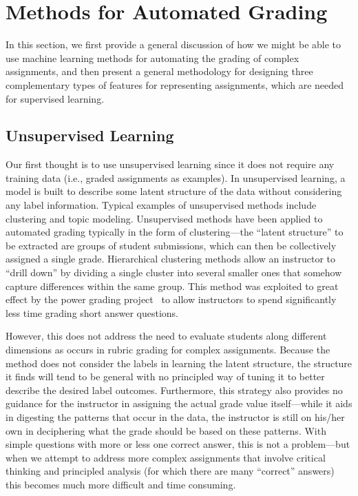 \section{Methods for Automated Grading}

In this section, we first provide a general discussion of how we might be able to use machine learning methods for automating the grading of complex assignments, and then present a general methodology for designing three complementary types of features for representing assignments, which are needed for supervised learning. 

\subsection{Unsupervised Learning}

Our first thought is to use unsupervised learning since it does not require any training data (i.e., graded assignments as examples).  In unsupervised learning, a model is built to describe some latent
structure of the data without considering any label information. Typical
examples of unsupervised methods include clustering and topic modeling.
Unsupervised methods have been applied to automated grading typically in
the form of clustering---the ``latent structure'' to be extracted are
groups of student submissions, which can then be collectively assigned a
single grade. Hierarchical clustering methods allow an instructor to
``drill down'' by dividing a single cluster into several smaller ones that
somehow capture differences within the same group. This method was
exploited to great effect by the power grading
project~\cite{Brooks:2014:Powergrading} to allow instructors to spend
significantly less time grading short answer questions.

However, this does not address the need to evaluate students along
different dimensions as occurs in rubric grading for complex assignments.  Because the method does
not consider the labels in learning the latent structure, the structure it
finds will tend to be general with no principled way of tuning it to
better describe the desired label outcomes. Furthermore, this strategy
also provides no guidance for the instructor in assigning the actual grade
value itself---while it aids in digesting the patterns that occur in the
data, the instructor is still on his/her own in deciphering what the grade
should be based on these patterns. With simple questions with more or less
one correct answer, this is not a problem---but when we attempt to address
more complex assignments that involve critical thinking and principled
analysis (for which there are many ``correct'' answers) this becomes much
more difficult and time consuming. 


